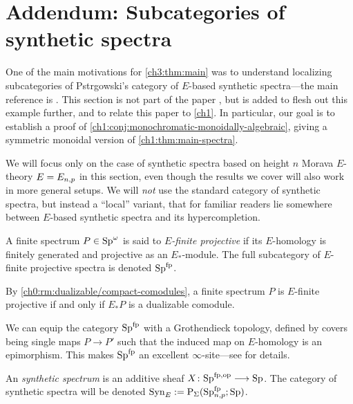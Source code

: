 
\section{Addendum: Subcategories of synthetic spectra}
\label{ch3:addendum}

One of the main motivations for \cref{ch3:thm:main} was to understand localizing subcategories of Pstr\a{}gowski's category of $E$-based synthetic spectra---the main reference is \cite{pstragowski_2022}. This section is not part of the paper \cite{aambo_2024_localizing}, but is added to flesh out this example further, and to relate this paper to \cref{ch1}. In particular, our goal is to establish a proof of \cref{ch1:conj:monochromatic-monoidally-algebraic}, giving a symmetric monoidal version of \cref{ch1:thm:main-spectra}. 

We will focus only on the case of synthetic spectra based on height $n$ Morava $E$-theory $E=E_{n,p}$ in this section, even though the results we cover will also work in more general setups. We will \emph{not} use the standard category of synthetic spectra, but instead a ``local'' variant, that for familiar readers lie somewhere between $E$-based synthetic spectra and its hypercompletion. 

\begin{definition}
    A finite spectrum $P\in \mathrm{Sp}^\omega$ is said to \emph{$E$-finite projective} if its $E$-homology is finitely generated and projective as an $E_{*}$-module. The full subcategory of $E$-finite projective spectra is denoted $\mathrm{Sp}^{\mathrm{fp}}$. 
\end{definition}

\begin{remark}
    By \cref{ch0:rm:dualizable/compact-comodules}, a finite spectrum $P$ is $E$-finite projective if and only if $E_{*}P$ is a dualizable comodule. 
\end{remark}

We can equip the category $\mathrm{Sp}^{\mathrm{fp}}$ with a Grothendieck topology, defined by covers being single maps $P\to P'$ such that the induced map on $E$-homology is an epimorphism. This makes $\mathrm{Sp}^{\mathrm{fp}}$ an excellent $\infty$-site---see \cite[Section 2.3]{pstragowski_2022} for details. 

\begin{definition}
    An \emph{synthetic spectrum} is an additive sheaf $X\colon \mathrm{Sp}^{\mathrm{fp}, \mathrm{op}}\longrightarrow \mathrm{Sp}$. The category of synthetic spectra will be denoted $\mathrm{Syn}_{E} := \mathrm{P}_\Sigma(\mathrm{Sp}_{n,p}^{\mathrm{fp}};\mathrm{Sp})$. 
\end{definition}

